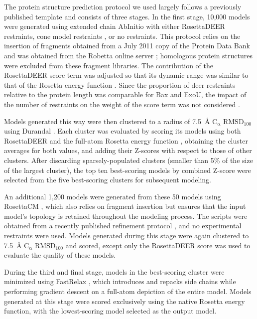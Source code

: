 The protein structure prediction protocol we used largely follows a previously published template \citep*{Ovchinnikov2015} and consists of three stages. In the first stage, 10,000 models were generated using extended chain AbInitio with either RosettaDEER restraints, \gls{cone} model restraints \citep*{Alexander2008}, or no restraints. This protocol relies on the insertion of fragments obtained from a July 2011 copy of the Protein Data Bank and was obtained from the Robetta online server \citep*{Kim2004}; homologous protein structures were excluded from these fragment libraries. The contribution of the RosettaDEER score term was adjusted so that its dynamic range was similar to that of the Rosetta energy function \citep*{Ovchinnikov2015}. Since the proportion of \gls{deer} restraints relative to the protein length was comparable for Bax and ExoU, the impact of the number of restraints on the weight of the score term was not considered \citep*{Weiner2014}. 

Models generated this way were then clustered to a radius of \SI{7.5}{\angstrom} $\mathrm{C_{\upalpha}}$ $\mathrm{RMSD_{100}}$ using Durandal \citep*{Berenger2012}. Each cluster was evaluated by scoring its models using both RosettaDEER and the full-atom Rosetta energy function \citep*{Alford2017}, obtaining the cluster averages for both values, and adding their Z-scores with respect to those of other clusters. After discarding sparsely-populated clusters (smaller than 5\% of the size of the largest cluster), the top ten best-scoring models by combined Z-score were selected from the five best-scoring clusters for subsequent modeling.

An additional 1,200 models were generated from these 50 models using RosettaCM \citep*{Song2013}, which also relies on fragment insertion but ensures that the input model’s topology is retained throughout the modeling process. The scripts were obtained from a recently published refinement protocol \citep*{Park2018}, and no experimental restraints were used. Models generated during this stage were again clustered to \SI{7.5}{\angstrom} $\mathrm{C_{\upalpha}}$ $\mathrm{RMSD_{100}}$ and scored, except only the RosettaDEER score was used to evaluate the quality of these models.

During the third and final stage, models in the best-scoring cluster were minimized using FastRelax \citep*{Conway2014}, which introduces and repacks side chains while performing gradient descent on a full-atom depiction of the entire model. Models generated at this stage were scored exclusively using the native Rosetta energy function, with the lowest-scoring model selected as the output model.

